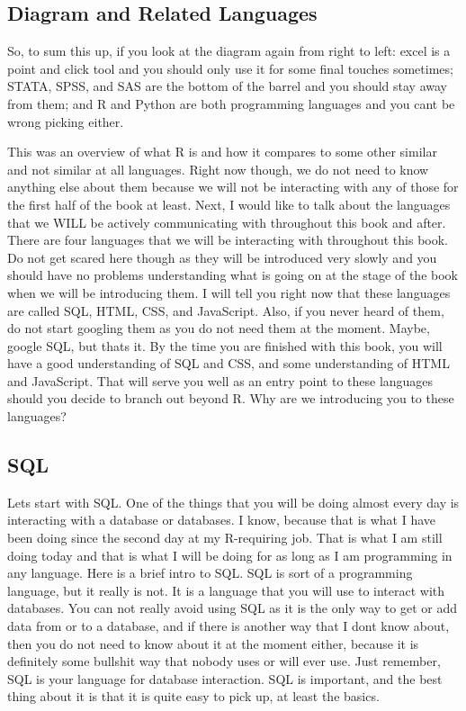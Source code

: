 \documentclass[]{book}
\begin{document}
\hypertarget{diagram-and-related-languages}{%
\subsection{Diagram and Related Languages}\label{diagram-and-related-languages}}

So, to sum this up, if you look at the diagram again from right to left: excel is a point and click tool and you should only use it for some final touches sometimes; STATA, SPSS, and SAS are the bottom of the barrel and you should stay away from them; and R and Python are both programming languages and you cant be wrong picking either.

This was an overview of what R is and how it compares to some other similar and not similar at all languages. Right now though, we do not need to know anything else about them because we will not be interacting with any of those for the first half of the book at least. Next, I would like to talk about the languages that we WILL be actively communicating with throughout this book and after.\\

There are four languages that we will be interacting with throughout this book. Do not get scared here though as they will be introduced very slowly and you should have no problems understanding what is going on at the stage of the book when we will be introducing them. I will tell you right now that these languages are called SQL, HTML, CSS, and JavaScript. Also, if you never heard of them, do not start googling them as you do not need them at the moment. Maybe, google SQL, but thats it. By the time you are finished with this book, you will have a good understanding of SQL and CSS, and some understanding of HTML and JavaScript. That will serve you well as an entry point to these languages should you decide to branch out beyond R.
Why are we introducing you to these languages?

\hypertarget{sql}{%
\subsection{SQL}\label{sql}}

Lets start with SQL. One of the things that you will be doing almost every day is interacting with a database or databases. I know, because that is what I have been doing since the second day at my R-requiring job. That is what I am still doing today and that is what I will be doing for as long as I am programming in any language. Here is a brief intro to SQL. SQL is sort of a programming language, but it really is not. It is a language that you will use to interact with databases. You can not really avoid using SQL as it is the only way to get or add data from or to a database, and if there is another way that I dont know about, then you do not need to know about it at the moment either, because it is definitely some bullshit way that nobody uses or will ever use. Just remember, SQL is your language for database interaction. SQL is important, and the best thing about it is that it is quite easy to pick up, at least the basics.
\end{document}
